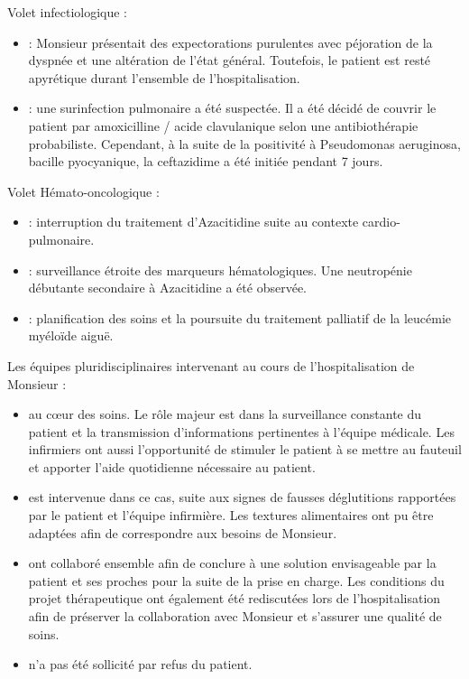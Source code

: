 Volet infectiologique : 
\begin{itemize}[label=\textbullet]
    \item {} : Monsieur présentait des expectorations purulentes avec péjoration de la dyspnée et une altération de l’état général. Toutefois, le patient est resté apyrétique durant l’ensemble de l’hospitalisation.
    \item {} : une surinfection pulmonaire a été suspectée. Il a été décidé de couvrir le patient par amoxicilline / acide clavulanique selon une antibiothérapie probabiliste. Cependant, à la suite de la positivité à Pseudomonas aeruginosa, bacille pyocyanique, la ceftazidime a été initiée pendant 7 jours.
    \end{itemize}

Volet Hémato-oncologique :
\begin{itemize}[label=\textbullet]
    \item {} : interruption du traitement d’Azacitidine suite au contexte cardio-pulmonaire. 
    \item {} : surveillance étroite des marqueurs hématologiques. Une neutropénie débutante secondaire à Azacitidine a été observée.
    \item {} : planification des soins et la poursuite du traitement palliatif de la leucémie myéloïde aiguë.
    \end{itemize}


Les équipes pluridisciplinaires intervenant au cours de l’hospitalisation de Monsieur :
\begin{itemize}[label=\textbullet]
    \item {} au cœur des soins. Le rôle majeur est dans la surveillance constante du patient et la transmission d’informations pertinentes à l’équipe médicale. Les infirmiers ont aussi l’opportunité de stimuler le patient à se mettre au fauteuil et apporter l’aide quotidienne nécessaire au patient. 
    \item {}  est intervenue dans ce cas, suite aux signes de fausses déglutitions rapportées par le patient et l’équipe infirmière. Les textures alimentaires ont pu être adaptées afin de correspondre aux besoins de Monsieur.
    \item {} ont collaboré ensemble afin de conclure à une solution envisageable par la patient et ses proches pour la suite de la prise en charge. Les conditions du projet thérapeutique ont également été rediscutées lors de l’hospitalisation afin de préserver la collaboration avec Monsieur et s’assurer une qualité de soins. 
    \item {} n’a pas été sollicité par refus du patient.
    \end{itemize}
    

